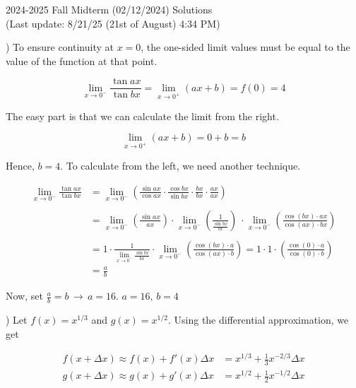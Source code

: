 \documentclass{article}
\begin{document}
\newpage

\begin{center}
2024-2025 Fall Midterm (02/12/2024) Solutions\\
(Last update: 8/21/25 (21st of August) 4:34 PM)
\end{center}

) To ensure continuity at $x=0$, the one-sided limit values must be equal to the value of the function at that point.

\[
\lim_{x\to0^-} \frac{\tan ax}{\tan bx} = \lim_{x\to0^+} (ax+b) = f(0) = 4
\]

\hfill

\noindent The easy part is that we can calculate the limit from the right.

\[
\lim_{x\to0^+} (ax+b) = 0+b = b
\]

\hfill

\noindent Hence, $b=4$. To calculate from the left, we need another technique.

\begin{align*}
\lim_{x\to0^-} \frac{\tan ax}{\tan bx} &= \lim_{x\to0^-} \left(\frac{\sin ax}{\cos ax} \cdot \frac{\cos bx}{\sin bx} \cdot \frac{bx}{bx}\cdot \frac{ax}{ax}\right)\\\\&=\lim_{x\to0^-} \left(\frac{\sin ax}{ax} \right)\cdot \lim_{x\to0^-} \left(\frac1{ \frac{\sin bx}{bx}}\right)\ \cdot \lim_{x\to0^-} \left(\frac{\cos (bx) \cdot ax}{\cos(ax) \cdot bx}\right)\\\\&=1\cdot  \frac1{\displaystyle \lim_{x\to0^-} \frac{\sin bx}{bx} }\cdot \lim_{x\to0^-} \left(\frac{\cos (bx) \cdot a}{\cos(ax) \cdot b}\right)= 1\cdot 1\cdot\left(\frac{\cos(0) \cdot a}{\cos(0) \cdot b}\right)\\&=\frac ab
\end{align*}

\hfill

\noindent Now, set $\displaystyle \frac ab = b\,\rightarrow\, a= 16$. $\boxed{a=16,\,b=4}$

\hfill

) Let $f(x) = x^{1/3}$ and $g(x) = x^{1/2}$. Using the differential approximation, we get

\begin{align*}
f(x+\Delta x)\approx f(x) + f'(x)\Delta x&=x^{1/3}+\frac13x^{-2/3}\Delta x\\
g(x+\Delta x)\approx g(x) + g'(x)\Delta x&=x^{1/2}+\frac12x^{-1/2}\Delta x
\end{align*}
\end{document}
